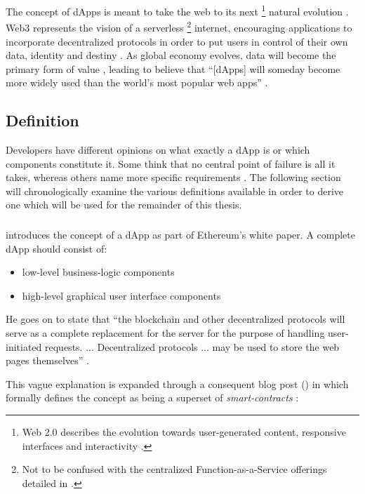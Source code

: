 The concept of \acp{dApp} is meant to take the web to its next \footnote{Web 2.0 describes the evolution towards user-generated content, responsive interfaces and interactivity \cite[p.~34]{Antonopoulos.2018}.} natural evolution \cite[pp.~34]{Antonopoulos.2018}. Web3 represents the vision of a serverless \footnote{Not to be confused with the centralized Function-as-a-Service offerings detailed in \cite{serverlessComputing}.} internet, encouraging applications to incorporate decentralized protocols in order to put users in control of their own data, identity and destiny \cite{web3}. As global economy evolves, data will become the primary form of value \cite[p.~25]{Raval.2016}, leading \citeauthor{Raval.2016} to believe that \enquote{[\acp{dApp}] will someday become more widely used than the world's most popular web apps} \cite[p.~5]{Raval.2016}.

\subsection{Definition}
Developers have different opinions on what exactly a \ac{dApp} is or which components constitute it. Some think that no central point of failure is all it takes, whereas others name more specific requirements \cite[p.~9]{Raval.2016}. The following section will chronologically examine the various definitions available in order to derive one which will be used for the remainder of this thesis.

\subsubsection{\citeyear{EthereumWhitepaper}}
\citeauthor{EthereumWhitepaper} introduces the concept of a \ac{dApp} as part of Ethereum's white paper. A complete \ac{dApp} should consist of:

\begin{itemize}
  \item low-level business-logic components
  \item high-level graphical user interface components
\end{itemize}

He goes on to state that \enquote{the blockchain and other decentralized protocols will serve as a complete replacement for the server for the purpose of handling user-initiated requests. ... Decentralized protocols ... may be used to store the web pages themselves} \cite[p.~34]{EthereumWhitepaper}. 

This vague explanation is expanded through a consequent blog post (\citeyear{Buterin2014}) in which \citeauthor{Buterin2014} formally defines the concept as being a superset of \textit{smart-contracts} \cite{Buterin2014}:

